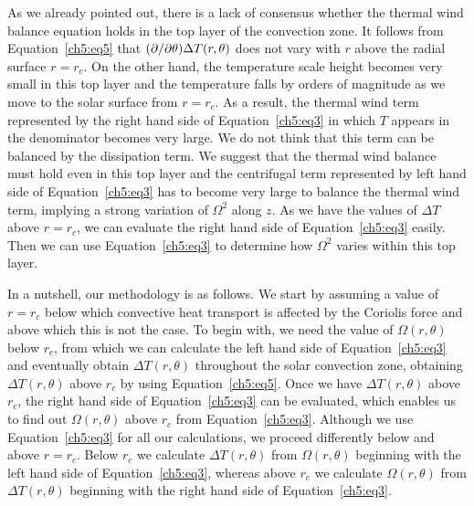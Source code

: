 As we already pointed out, there is a lack of consensus whether the thermal wind balance equation holds in the top layer of the convection zone.  It follows from Equation~\ref{ch5:eq5} that $(\partial/\partial \theta) \Delta T (r,\theta)$ does not vary with $r$ above the radial surface $r = r_c$.  On the other hand, the temperature scale height becomes very small in this top layer and the temperature falls by orders of magnitude as we move to the solar surface from $r = r_c$. As a result, the thermal wind term represented by the right hand side of Equation~\ref{ch5:eq3} in which $T$ appears in the denominator becomes very large.  We do not think that this term can be balanced by the dissipation term.  We suggest that the thermal wind balance must hold even in this top layer and the centrifugal term represented by left hand side of Equation~\ref{ch5:eq3} has to become very large to balance the thermal wind term, implying a strong variation of $\Omega^2$ along $z$. As we have the values of $\Delta T$ above $r = r_c$, we can evaluate the right hand side of Equation~\ref{ch5:eq3} easily.  Then we can use Equation~\ref{ch5:eq3} to determine how $\Omega^2$ varies within this top layer.

In a nutshell, our methodology is as follows.  We start by assuming a value of $r = r_c$ below which convective heat transport is affected by the Coriolis force and above which this is not the case.  To begin with, we need the value of $\Omega (r, \theta)$ below $r_c$, from which we can calculate the left hand side of Equation~\ref{ch5:eq3} and eventually obtain $\Delta T (r, \theta)$ throughout the solar convection zone, obtaining $\Delta T (r, \theta)$ above $r_c$ by using Equation~\ref{ch5:eq5}.  Once we have $\Delta T (r, \theta)$ above $r_c$, the right hand side of Equation~\ref{ch5:eq3} can be evaluated, which enables us to find out $\Omega (r, \theta)$ above $r_c$ from Equation~\ref{ch5:eq3}. Although we use Equation~\ref{ch5:eq3} for all our calculations, we proceed differently below and above $r = r_c$.  Below $r_c$ we calculate $\Delta T (r, \theta)$ from $\Omega (r, \theta)$ beginning with the left hand side of Equation~\ref{ch5:eq3}, whereas above $r_c$ we calculate $\Omega (r, \theta)$ from $\Delta T (r, \theta)$ beginning with the right hand side of Equation~\ref{ch5:eq3}.



